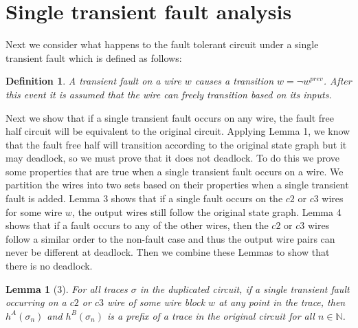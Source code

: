 \documentclass[12pt]{report}
\newtheorem*{definition}{Definition}
\newtheorem*{lemma}{Lemma}
\begin{document}
\section{Single transient fault analysis}
Next we consider what happens to the fault tolerant circuit under a single transient fault which is defined as follows:
\begin{definition}A transient fault on a wire $w$ causes a transition $w= \lnot w^{prev}$.  After this event it is assumed that the wire can freely transition based on its inputs. %
\end{definition}
Next we show that if a single transient fault occurs on any wire, the fault free half circuit will be equivalent to the original circuit.  Applying Lemma 1, we know that the fault free half will transition according to the original state graph but it may deadlock, so we must prove that it does not deadlock.  To do this we prove some properties that are true when a single transient fault occurs on a wire.  We partition the wires into two sets based on their properties when a single transient fault is added.  Lemma 3 shows that if a single fault occurs on the $c2$ or $c3$ wires for some wire $w$, the output wires still follow the original state graph.  Lemma 4 shows that if a fault occurs to any of the other wires, then the $c2$ or $c3$ wires follow a similar order to the non-fault case and thus the output wire pairs can never be different at deadlock.  Then we combine these Lemmas to show that there is no deadlock.
\begin{lemma}[3]
For all traces $\sigma$ in the duplicated circuit, if a single transient fault occurring on a $c2$ or $c3$ wire of some wire block $w$ at any point in the trace, then $h^{A}(\sigma_n)$ and $h^{B}(\sigma_n)$ is a prefix of a trace in the original circuit for all $n \in \mathbb{N}$.
\end{lemma}
\end{document}
